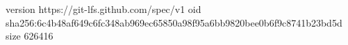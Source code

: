 version https://git-lfs.github.com/spec/v1
oid sha256:6c4b48af649c6fc348ab969ec65850a98f95a6bb9820bee0b6f9c8741b23bd5d
size 626416
